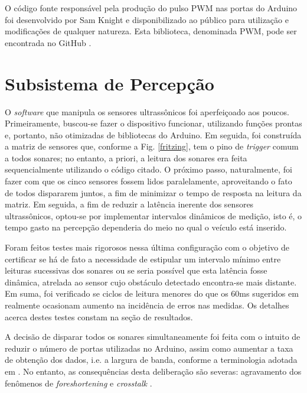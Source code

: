O código fonte responsável pela produção do pulso PWM nas portas do Arduino foi desenvolvido por Sam Knight e disponibilizado ao público para 
utilização e modificações de qualquer natureza.
Esta biblioteca, denominada PWM, pode ser encontrada no GitHub \cite{pwm_lib}.


\section{Subsistema de Percepção}
O \textit{software} que manipula os sensores ultrassônicos foi aperfeiçoado aos poucos.
Primeiramente, buscou-se fazer o dispositivo funcionar, utilizando funções prontas e, portanto, não otimizadas de bibliotecas do Arduino.
Em seguida, foi construída a matriz de sensores que, conforme a Fig. \ref{fritzing}, tem o pino de \textit{trigger} comum a todos sonares; no 
entanto, a priori, a leitura dos sonares era feita sequencialmente utilizando o código citado.
O próximo passo, naturalmente, foi fazer com que os cinco sensores fossem lidos paralelamente, aproveitando o fato de todos dispararem juntos, a fim 
de minimizar o tempo de resposta na leitura da matriz.
Em seguida, a fim de reduzir a latência inerente dos sensores ultrassônicos, optou-se por implementar intervalos dinâmicos de medição, isto é, o 
tempo gasto na percepção dependeria do meio no qual o veículo está inserido.  

Foram feitos testes mais rigorosos nessa última configuração com o objetivo de certificar se há de fato a necessidade de estipular um intervalo 
mínimo entre leituras sucessivas dos sonares ou se seria possível que esta latência fosse dinâmica, atrelada ao sensor cujo obstáculo detectado 
encontra-se mais distante.
Em suma, foi verificado se ciclos de leitura menores do que os 60ms sugeridos em  realmente ocasionam aumento na incidência de 
erros 
nas medidas. Os detalhes acerca destes testes constam na seção de resultados.

A decisão de disparar todos os sonares simultaneamente foi feita com o intuito de reduzir o número de portas utilizadas no Arduino, assim como 
aumentar a taxa de obtenção dos dados, i.e. a largura de banda, conforme a terminologia adotada  em \cite{roseli}.
No entanto, as consequências desta deliberação são  severas: agravamento dos fenômenos de \textit{foreshortening} e \textit{crosstalk} 
\cite{2016_artigo_5}. %

